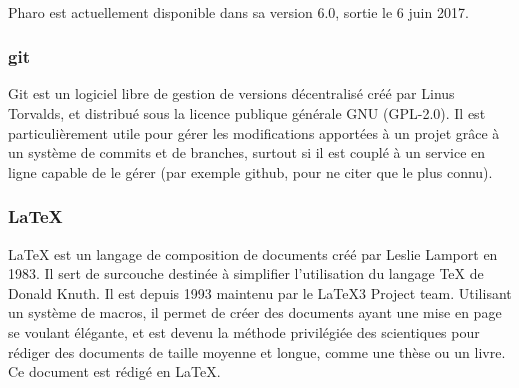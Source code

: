	\paragraph{}
	Pharo est actuellement disponible dans sa version 6.0, sortie le 6 juin 2017.

	\subsubsection{git}
	Git est un logiciel libre de gestion de versions décentralisé créé par Linus Torvalds, et distribué sous la licence publique générale GNU (GPL-2.0). Il est particulièrement utile pour gérer les modifications apportées à un projet grâce à un système de commits et de branches, surtout si il est couplé à un service en ligne capable de le gérer (par exemple github, pour ne citer que le plus connu).

	\subsubsection{LaTeX}
	LaTeX est un langage de composition de documents créé par Leslie Lamport en 1983. Il sert de surcouche destinée à simplifier l'utilisation du langage TeX de Donald Knuth. Il est depuis 1993 maintenu par le LaTeX3 Project team. Utilisant un système de macros, il permet de créer des documents ayant une mise en page se voulant élégante, et est devenu la méthode privilégiée des scientiques pour rédiger des documents de taille moyenne et longue, comme une thèse ou un livre. Ce document est rédigé en LaTeX.